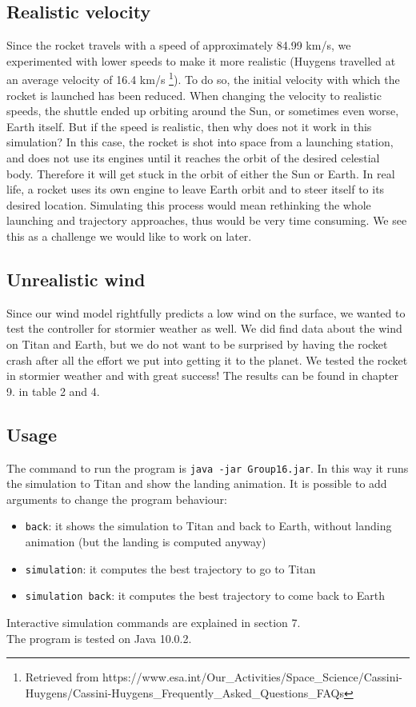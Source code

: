 \documentclass[10pt,a4paper]{article}
\begin{document}
	\subsection{Realistic velocity}
	Since the rocket travels with a speed of approximately 84.99 km/s, we experimented with lower speeds to make it more realistic (Huygens travelled at an average velocity of 16.4 km/s \footnote{Retrieved from https://www.esa.int/Our\_Activities/Space\_Science/Cassini-Huygens/Cassini-Huygens\_Frequently\_Asked\_Questions\_FAQs}). To do so, the initial velocity with which the rocket is launched has been reduced. When changing the velocity to realistic speeds, the shuttle ended up orbiting around the Sun, or sometimes even worse, Earth itself. But if the speed is realistic, then why does not it work in this simulation? In this case, the rocket is shot into space from a launching station, and does not use its engines until it reaches the orbit of the desired celestial body. Therefore it will get stuck in the orbit of either the Sun or Earth. In real life, a rocket uses its own engine to leave Earth orbit and to steer itself to its desired location. Simulating this process would mean rethinking the whole launching and trajectory approaches, thus would be very time consuming. We see this as a challenge we would like to work on later.
	
	\subsection{Unrealistic wind}
	Since our wind model rightfully predicts a low wind on the surface, we wanted to test the controller for stormier weather as well. We did find data about the wind on Titan and Earth, but we do not want to be surprised by having the rocket crash after all the effort we put into getting it to the planet. We tested the rocket in stormier weather and with great success! The results can be found in chapter 9. in table 2 and 4.
	
	
	\subsection{Usage}    
	The command to run the program is \verb|java -jar Group16.jar|. In this way it runs the simulation to Titan and show the landing animation. It is possible to add arguments to change the program behaviour:
	\begin{itemize}
		\item \verb|back|: it shows the simulation to Titan and back to Earth, without landing animation (but the landing is computed anyway)
		\item \verb|simulation|: it computes the best trajectory to go to Titan
		\item \verb|simulation back|: it computes the best trajectory to come back to Earth
	\end{itemize}
	Interactive simulation commands are explained in section 7.\\
	The program is tested on Java 10.0.2.
	
\end{document}
